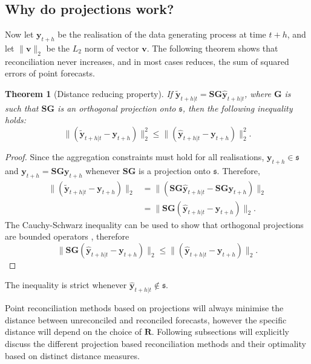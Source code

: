\documentclass[12pt]{article}
\newtheorem{theo}{Theorem}[section]
\theoremstyle{definition}
\theoremstyle{property}
\begin{document}
	\subsection{Why do projections work?}
	
		
	Now let $\bm{y}_{t+h}$ be the realisation of the data generating process at time $t+h$, and let $\|\bm{v}\|_2$ be the $L_2$ norm of vector $\bm{v}$. The following theorem shows that reconciliation never increases, and in most cases reduces, the sum of squared errors of point forecasts.
	
	
	
	\begin{theo}[Distance reducing property]
		If $\tilde{\bm{y}}_{t+h|t}=\bm{S}\bm{G}\hat{\bm{y}}_{t+h|t}$, where $\bm{G}$ is such that $\bm{S}\bm{G}$ is an orthogonal projection onto $\mathfrak{s}$, then the following inequality holds:
		\begin{equation}
		\|(\tilde{\bm{y}}_{t+h|t}-\bm{y}_{t+h})\|^2_2\le\|(\hat{\bm{y}}_{t+h|t}-\bm{y}_{t+h})\|^2_2.
		\end{equation}
	\end{theo}
	\begin{proof}
		Since the aggregation constraints must hold for all realisations, $\bm{y}_{t+h}\in\mathfrak{s}$ and $\bm{y}_{t+h}=\bm{S}\bm{G}\bm{y}_{t+h}$ whenever $\bm{S}\bm{G}$ is a projection onto $\mathfrak{s}$. Therefore,
		\begin{align}
		\|(\tilde{\bm{y}}_{t+h|t}-\bm{y}_{t+h})\|_2&=\|(\bm{S}\bm{G}\hat{\bm{y}}_{t+h|t}-\bm{S}\bm{G}\bm{y}_{t+h})\|_2\\
		&=\|\bm{S}\bm{G}(\hat{\bm{y}}_{t+h|t}-\bm{y}_{t+h})\|_2.
		\end{align}
		The Cauchy-Schwarz inequality can be used to show that orthogonal projections are bounded operators \citep{Hun2001}, therefore
		\begin{equation*}
		\|\bm{S}\bm{G}(\hat{\bm{y}}_{t+h|t}-\bm{y}_{t+h})\|_2\le
		\|(\hat{\bm{y}}_{t+h|t}-\bm{y}_{t+h})\|_2.
		\end{equation*}
	\end{proof}
	The inequality is strict whenever $\hat{\bm{y}}_{t+h|t}\notin\mathfrak{s}$.
	
	Point reconciliation methods based on projections will always minimise the distance between unreconciled and reconciled forecasts, however the specific distance will depend on the choice of $\bm{R}$. Following subsections will explicitly discuss the different projection based reconciliation methods and their optimality based on distinct distance measures. 
	
\end{document}

